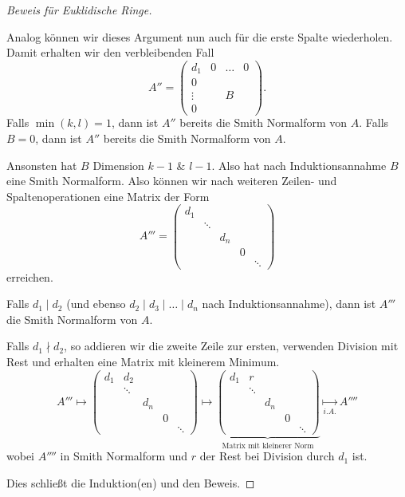 \begin{proof}[Beweis für Euklidische Ringe]
\begin{itemize}
			Analog können wir dieses Argument nun auch für die erste Spalte wiederholen.
			Damit erhalten wir den verbleibenden Fall
			\[
			A'' = \begin{pmatrix} 
				d_1 &0 &\ldots &0\\
				0\\
				\vdots & &B\\
				0
			\end{pmatrix} 
			.\]
			Falls $\min(k,l) = 1$, dann ist $A''$ bereits die Smith Normalform von $A$.
			Falls $B = 0$, dann ist $A''$ bereits die Smith Normalform von  $A$.

			Ansonsten hat $B$ Dimension $k-1$ \& $l-1$. Also hat nach Induktionsannahme $B$
			eine Smith Normalform. Also können wir nach weiteren Zeilen- und Spaltenoperationen eine Matrix der Form
			\[
			A''' = \begin{pmatrix} 
				d_1 \\
				& \ddots \\
				& & d_{n} \\
				& & & 0 \\
				& & & & \ddots
			\end{pmatrix} 
			\] 
			erreichen.

			Falls $d_1 \mid d_2$ (und ebenso $d_2 \mid d_3 \mid \ldots \mid d_{n}$ nach Induktionsannahme), dann ist $A'''$ die Smith Normalform von $A$.

			Falls $d_1 \nmid d_2$, so addieren wir die zweite Zeile zur ersten, verwenden Division mit Rest und erhalten eine Matrix mit kleinerem Minimum.
			\[
			A''' \longmapsto \begin{pmatrix} 
				d_1 &d_2\\
				& \ddots \\
				& & d_{n} \\
				& & & 0 \\
				& & & & \ddots
			\end{pmatrix} \mapsto \underbrace{\begin{pmatrix} 
				d_1 &r \\
				& \ddots \\
				& & d_{n} \\
				& & & 0 \\
				& & & & \ddots
		\end{pmatrix}}_{\text{Matrix mit kleinerer Norm}} \underset{i.A.}{\longmapsto} A''''
			\] 
			wobei $A''''$ in Smith Normalform und $r$ der Rest bei Division durch $d_1$ ist.
	\end{itemize}
	Dies schließt die Induktion(en) und den Beweis.
\end{proof}

